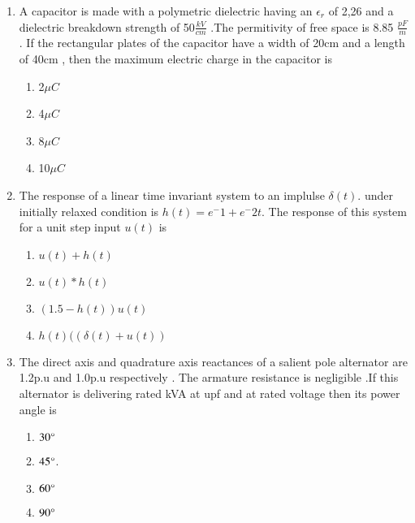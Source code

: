 \documentclass[journal]{IEEEtran}
\begin{document}
\begin{enumerate}
    

 

    \item A capacitor is made with a polymetric dielectric having an $\epsilon_r$ of 2,26 and a dielectric breakdown strength of 50$\frac{kV}{cm}$ .The permitivity of free space is 8.85 $\frac{pF}{m}$ . If the rectangular plates of the capacitor have a width of 20cm and a length of 40cm , then the maximum electric charge in the capacitor is
    \begin{multicols}{4}
			\begin{enumerate}
\item 2$\mu C$
\item 4$\mu C$
\item 8$\mu C$
\item 10$\mu C$
        \end{enumerate}
		\end{multicols}


    \item The response of a linear time invariant system to an implulse $\delta (t)$. under initially relaxed condition is $h(t)=e^-1 +e^-2t$. The response of this system for a unit step input $u(t)$ is


		\begin{multicols}{4}
			\begin{enumerate}
	\item  $u(t) +h(t)$
\item $u(t)*h(t)$
\item$(1.5-h(t))u(t)$
\item $h(t)((\delta  (t) + u(t))$
			\end{enumerate}
		\end{multicols}


    \item The direct axis and quadrature axis reactances of a salient pole alternator are 1.2p.u and 1.0p.u respectively . The armature resistance is negligible .If this alternator is delivering rated kVA at upf and at rated voltage then its power angle is 
        
            \begin{enumerate}
             \item $30\degree$
\item $45\degree$.
\item  $60\degree$
\item $90\degree$            \end{enumerate}




\end{enumerate}
\end{document}
